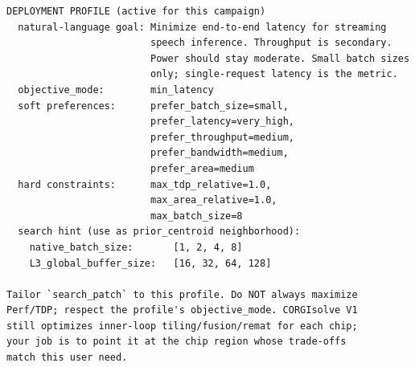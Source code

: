 \begin{tcolorbox}[
    colback=green!6,
    colframe=green!45!black,
    title=\textbf{Deployment Profile: \texttt{interactive\_speech}},
    fonttitle=\bfseries,
    breakable,
    left=4pt, right=4pt, top=4pt, bottom=4pt
]
\begin{verbatim}
DEPLOYMENT PROFILE (active for this campaign)
  natural-language goal: Minimize end-to-end latency for streaming
                         speech inference. Throughput is secondary.
                         Power should stay moderate. Small batch sizes
                         only; single-request latency is the metric.
  objective_mode:        min_latency
  soft preferences:      prefer_batch_size=small,
                         prefer_latency=very_high,
                         prefer_throughput=medium,
                         prefer_bandwidth=medium,
                         prefer_area=medium
  hard constraints:      max_tdp_relative=1.0,
                         max_area_relative=1.0,
                         max_batch_size=8
  search hint (use as prior_centroid neighborhood):
    native_batch_size:       [1, 2, 4, 8]
    L3_global_buffer_size:   [16, 32, 64, 128]

Tailor `search_patch` to this profile. Do NOT always maximize
Perf/TDP; respect the profile's objective_mode. CORGIsolve V1
still optimizes inner-loop tiling/fusion/remat for each chip;
your job is to point it at the chip region whose trade-offs
match this user need.
\end{verbatim}
\end{tcolorbox}

\bigskip

